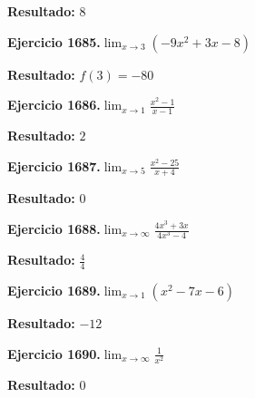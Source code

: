 \documentclass[10pt,a4paper]{article}
\begin{document}
\begin{solbox}
\textbf{Resultado:} \(\displaystyle 8\)
\end{solbox}

\begin{ejbox}
\textbf{Ejercicio 1685.}\quad $\lim_{x\to 3} (-9x^2 +3x -8)$
\end{ejbox}

\begin{solbox}
\textbf{Resultado:} \(\displaystyle f(3) = -80\)
\end{solbox}

\begin{ejbox}
\textbf{Ejercicio 1686.}\quad $\lim_{x\to 1} \frac{x^2-1}{x-1}$
\end{ejbox}

\begin{solbox}
\textbf{Resultado:} \(\displaystyle 2\)
\end{solbox}

\newpage
\begin{ejbox}
\textbf{Ejercicio 1687.}\quad $\lim_{x\to 5} \frac{x^2-25}{x+4}$
\end{ejbox}

\begin{solbox}
\textbf{Resultado:} \(\displaystyle 0\)
\end{solbox}

\begin{ejbox}
\textbf{Ejercicio 1688.}\quad $\lim_{x\to \infty} \frac{4x^3 + 3x}{4x^3 - 4}$
\end{ejbox}

\begin{solbox}
\textbf{Resultado:} \(\displaystyle \frac{4}{4}\)
\end{solbox}

\begin{ejbox}
\textbf{Ejercicio 1689.}\quad $\lim_{x\to 1} (x^2 -7x -6)$
\end{ejbox}

\begin{solbox}
\textbf{Resultado:} \(\displaystyle -12\)
\end{solbox}

\newpage
\begin{ejbox}
\textbf{Ejercicio 1690.}\quad $\lim_{x\to \infty} \frac{1}{x^2}$
\end{ejbox}

\begin{solbox}
\textbf{Resultado:} \(\displaystyle 0\)
\end{solbox}
\end{document}

